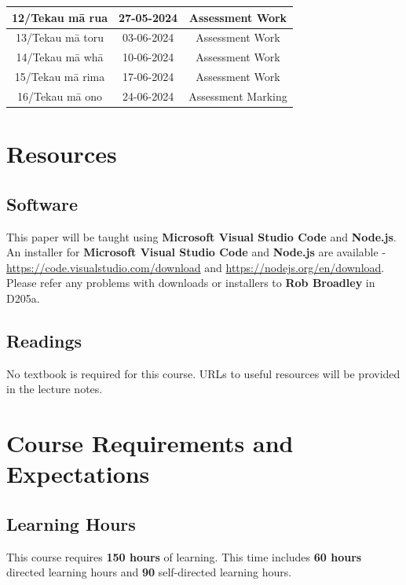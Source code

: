 \documentclass{article}
\begin{document}
\begin{tabular}{|c|c|c|c|}
	12/Tekau mā rua  & 27-05-2024 & \multicolumn{2}{c|}{Assessment Work}                                                                 \\ \hline
	13/Tekau mā toru & 03-06-2024 & \multicolumn{2}{c|}{Assessment Work}                                                     \\ \hline
	14/Tekau mā whā  & 10-06-2024 & \multicolumn{2}{c|}{Assessment Work} \\ \hline 
	15/Tekau mā rima & 17-06-2024 & \multicolumn{2}{c|}{Assessment Work}                                                       \\ \hline
	16/Tekau mā ono  & 24-06-2024 & \multicolumn{2}{c|}{Assessment Marking}                                                         \\ \hline
\end{tabular} 

\section*{Resources}

\subsection*{Software}
This paper will be taught using \textbf{Microsoft Visual Studio Code} and \textbf{Node.js}. An installer for \textbf{Microsoft Visual Studio Code} and \textbf{Node.js} are available - \href{https://code.visualstudio.com/download}{https://code.visualstudio.com/download} and \href{https://nodejs.org/en/download}{https://nodejs.org/en/download}. Please refer any problems with downloads or installers to \textbf{Rob Broadley} in D205a.

\subsection*{Readings}
No textbook is required for this course. URLs to useful resources will be provided in the lecture notes. 

\section*{Course Requirements and Expectations}

\subsection*{Learning Hours}
This course requires \textbf{150 hours} of learning. This time includes \textbf{60 hours} directed learning hours and \textbf{90} self-directed learning hours.  
\end{document}
